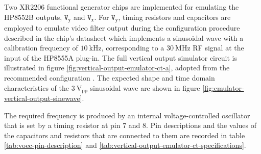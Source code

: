 \documentclass[class=report,11pt,crop=false]{standalone}
\begin{document}
	Two XR2206 functional generator chips are implemented for emulating the HP8552B outputs, $\texttt{V}_\texttt{y}$ and $\texttt{V}_\texttt{x}$. For $\texttt{V}_\texttt{y}$, timing resistors and capacitors are employed to emulate video filter output during the configuration procedure described in the chip's datasheet which implements a sinusoidal wave with a calibration frequency of $\SI{10}{\kilo\hertz}$, corresponding to a $\SI{30}{\mega\hertz}$ RF signal at the input of the HP8555A plug-in. The full vertical output simulator circuit is illustrated in figure \ref{fig:vertical-output-emulator-ct-a}, adopted from the recommended configuration \cite{xr2206}. The expected shape and time domain characteristics of the $3~\text{V}_\text{pp}$ sinusoidal wave are shown in figure \ref{fig:emulator-vertical-output-sinewave}. 
	
		
	The required frequency is produced by an internal voltage-controlled oscillator that is set by a timing resistor at pin 7 and 8. Pin descriptions and the values of the capacitors and resistors that are connected to them are recorded in table \ref{tab:voec-pin-description} and \ref{tab:vertical-output-emulator-ct-specifications}.
	
\end{document}
